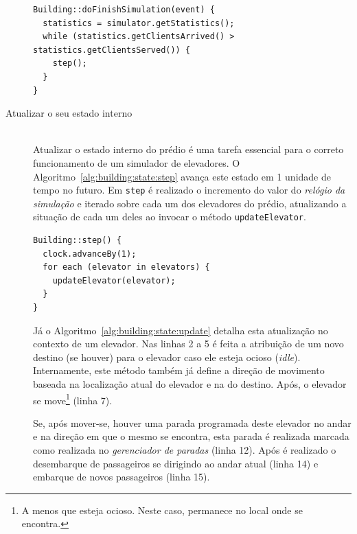 \begin{description}
    \begin{algorithm}[htb!]
      \centering
        \begin{verbatim}
Building::doFinishSimulation(event) {
  statistics = simulator.getStatistics();
  while (statistics.getClientsArrived() > statistics.getClientsServed()) {
    step();
  }
}
        \end{verbatim}
      \caption{\textit{Prédio} reagindo ao \textit{fim da simulação}.}
      \label{alg:building:finish}
    \end{algorithm}

  \item[Atualizar o seu estado interno] \hfill \\

    Atualizar o estado interno do prédio é uma tarefa essencial para o correto
    funcionamento de um simulador de elevadores. O
    Algoritmo~\ref{alg:building:state:step} avança este estado em 1 unidade de
    tempo no futuro. Em \texttt{step} é realizado o incremento do valor do
    \textit{relógio da simulação} e iterado sobre cada um dos elevadores do
    prédio, atualizando a situação de cada um deles ao invocar o método
    \texttt{updateElevator}.

    \begin{algorithm}[htb!]
      \centering
        \begin{verbatim}
Building::step() {
  clock.advanceBy(1);
  for each (elevator in elevators) {
    updateElevator(elevator);
  }
}
        \end{verbatim}
      \caption{\textit{Prédio} atualizando seu \textit{estado interno} em 1 \textit{unidade de tempo}.}
      \label{alg:building:state:step}
    \end{algorithm}

    Já o Algoritmo~\ref{alg:building:state:update} detalha esta atualização no
    contexto de um elevador. Nas linhas 2 a 5 é feita a atribuição de um novo
    destino (se houver) para o elevador caso ele esteja ocioso (\textit{idle}).
    Internamente, este método também já define a direção de movimento baseada na
    localização atual do elevador e na do destino. Após, o elevador se
    move\footnote{A menos que esteja ocioso. Neste caso, permanece no local onde
    se encontra.} (linha 7).

    Se, após mover-se, houver uma parada programada deste elevador no andar e na
    direção em que o mesmo se encontra, esta parada é realizada marcada como
    realizada no \textit{gerenciador de paradas} (linha 12). Após é realizado o
    desembarque de passageiros se dirigindo ao andar atual (linha 14) e embarque
    de novos passageiros (linha 15).


\end{description}
